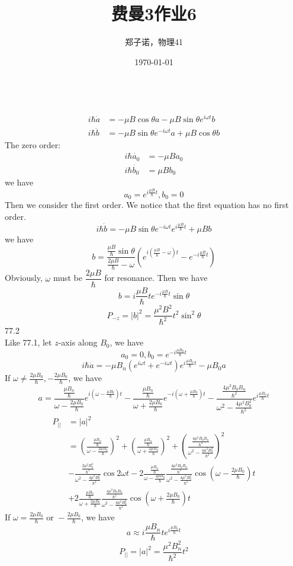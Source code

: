 \documentclass[utf8]{ctexart}
\title{费曼3作业6}
\author{郑子诺，物理41}
\date{\today}
\begin{document}
\maketitle
{}\\
\begin{align*}
	i\hbar\dot{a}&=-\mu B\cos\theta a-\mu B\sin\theta e^{i\omega t}b\\
	i\hbar\dot{b}&=-\mu B\sin\theta e^{-i\omega t}a+\mu B\cos\theta b
\end{align*}
The zero order:
\begin{align*}
	i\hbar\dot{a_0}&=-\mu Ba_0\\
	i\hbar\dot{b_0}&=\mu Bb_0
\end{align*}
we have
\[a_0=e^{i\frac{\mu B}{\hbar}t},b_0=0\]
Then we consider the first order. We notice that the first equation has no first order.
\[i\hbar\dot{b}=-\mu B\sin\theta e^{-i\omega t}e^{i\frac{\mu B}{\hbar}t}+\mu Bb\]
we have
\[b=\frac{\frac{\mu B}{\hbar}\sin\theta}{\frac{2\mu B}{\hbar}-\omega}(e^{i(\frac{\mu B}{\hbar}-\omega)t}-e^{-i\frac{\mu B}{\hbar}t})\]
Obviously, $\omega$ must be $\dfrac{2\mu B}{\hbar}$ for resonance. Then we have
\[b=i\frac{\mu B}{\hbar}te^{-i\frac{\mu B}{\hbar}t}\sin\theta\]
\[P_{-z}=|b|^2=\frac{\mu^2B^2}{\hbar^2}t^2\sin^2\theta\]
77.2\\
Like 77.1, let $z$-axis along $B_0$, we have
\[a_0=0,b_0=e^{-i\frac{\mu B_0}{\hbar}t}\]
\[i\hbar\dot{a}=-\mu B_n(e^{i\omega t}+e^{-i\omega t})e^{i\frac{\mu B_0}{\hbar}t}-\mu B_0a\]
If $\omega\neq\frac{2\mu B_0}{\hbar},-\frac{2\mu B_0}{\hbar}$, we have
\[a=\frac{\frac{\mu B_n}{\hbar}}{\omega-\frac{2\mu B_0}{\hbar}}e^{i(\omega-\frac{\mu B_0}{\hbar})t}-\frac{\frac{\mu B_n}{\hbar}}{\omega+\frac{2\mu B_0}{\hbar}}e^{-i(\omega+\frac{\mu B_0}{\hbar})t}-\frac{\frac{4\mu^2 B_0B_n}{\hbar^2}}{\omega^2-\frac{4\mu^2 B_0^2}{\hbar^2}}e^{i\frac{\mu B_0}{\hbar}t}\]
\begin{align*}
	P_{||}&=|a|^2\\
	&=(\frac{\frac{\mu B_n}{\hbar}}{\omega-\frac{2\mu B_0}{\hbar}})^2+(\frac{\frac{\mu B_n}{\hbar}}{\omega+\frac{2\mu B_0}{\hbar}})^2+(\frac{\frac{4\mu^2 B_0B_n}{\hbar^2}}{\omega^2-\frac{4\mu^2 B_0^2}{\hbar^2}})^2\\
	&-\frac{\frac{2\mu^2 B_n^2}{\hbar^2}}{\omega^2-\frac{4\mu^2 B_0^2}{\hbar^2}}\cos2\omega t-2\frac{\frac{\mu B_n}{\hbar}}{\omega-\frac{2\mu B_0}{\hbar}}\frac{\frac{4\mu^2 B_0B_n}{\hbar^2}}{\omega^2-\frac{4\mu^2 B_0^2}{\hbar^2}}\cos(\omega-\frac{2\mu B_0}{\hbar})t\\
	&+2\frac{\frac{\mu B_n}{\hbar}}{\omega+\frac{2\mu B_0}{\hbar}}\frac{\frac{4\mu^2 B_0B_n}{\hbar^2}}{\omega^2-\frac{4\mu^2 B_0^2}{\hbar^2}}\cos(\omega+\frac{2\mu B_0}{\hbar})t
\end{align*}
If $\omega=\frac{2\mu B_0}{\hbar}\text{ or }-\frac{2\mu B_0}{\hbar}$, we have
\[a\approx i\frac{\mu B_n}{\hbar}te^{i\frac{\mu B_0}{\hbar}t}\]
\[P_{||}=|a|^2=\frac{\mu^2B_n^2}{\hbar^2}t^2\]
\end{document}
